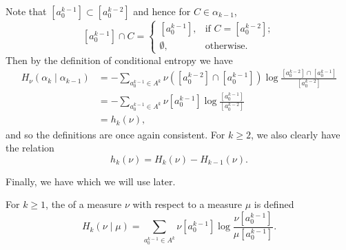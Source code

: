 Note that $[a_0^{k - 1}] \subset [a_0^{k - 2}]$ and hence for $C \in \alpha_{k - 1}$,
\[
	[a_0^{k - 1}] \cap C =
	\begin{cases}
		\left[a_0^{k - 1}\right],	& \text{if } C = [a_0^{k - 2}]; \\
		\emptyset,	& \text{otherwise}.
	\end{cases}
\]
Then by the definition of conditional entropy we have
\begin{align*}
	H_\nu(\alpha_k \mid \alpha_{k - 1}) &= -\sum_{a_0^{k - 1} \in A^k}{\nu([a_0^{k - 2}] \cap [a_0^{k - 1}]) \log{\frac{[a_0^{k - 2}] \cap [a_0^{k - 1}]}{[a_0^{k - 2}]}}} \\
		&= -\sum_{a_0^{k - 1} \in A^k}{\nu[a_0^{k - 1}] \log{\frac{[a_0^{k - 1}]}{[a_0^{k - 2}]}}} \\
		&= h_k(\nu),
\end{align*}
and so the definitions are once again consistent. For $k \geq 2$, we also clearly have the relation
\[
	h_k(\nu) = H_k(\nu) - H_{k - 1}(\nu).
\]

Finally, we have  which we will use later.

\begin{definition}
	For $k \geq 1$, the  of a measure $\nu$ with respect to a measure $\mu$ is defined
	\[
		H_k(\nu \mid \mu) = \sum_{a_0^{k - 1} \in A^k}{\nu[a_0^{k - 1}] \log{\frac{\nu[a_0^{k - 1}]}{\mu[a_0^{k - 1}]}}}.
	\]
\end{definition}
